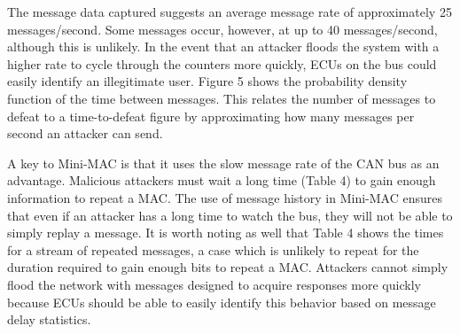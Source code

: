 The message data captured suggests an average message rate of approximately 25 messages/second. Some messages occur, however, at up to 40 messages/second, although this is unlikely. In the event that an attacker floods the system with a higher rate to cycle through the counters more quickly, ECUs on the bus could easily identify an illegitimate user. Figure 5 shows the probability density function of the time between messages. This relates the number of messages to defeat to a time-to-defeat figure by approximating how many messages per second an attacker can send.



A key to Mini-MAC is that it uses the slow message rate of the CAN bus as an advantage. Malicious attackers must wait a long time (Table 4) to gain enough information to repeat a MAC. The use of message history in Mini-MAC ensures that even if an attacker has a long time to watch the bus, they will not be able to simply replay a message. It is worth noting as well that Table 4 shows the times for a stream of repeated messages, a case which is unlikely to repeat for the duration required to gain enough bits to repeat a MAC. Attackers cannot simply flood the network with messages designed to acquire responses more quickly because ECUs should be able to easily identify this behavior based on message delay statistics.


